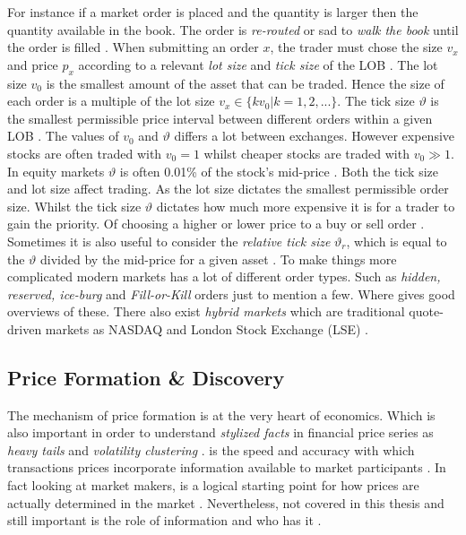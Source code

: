 \documentclass{kththesis}
\theoremstyle{definition}
\begin{document}
\newpage
For instance if a market order is placed and the quantity is larger then the quantity available in the book. The order is \textit{re-routed} or sad to \textit{walk the book} until the order is filled \parencite{hasbrouck2007empirical,cartea2015algorithmic}. When submitting an order $x$, the trader must chose the size $v_x$ and price $p_{x}$ according to a relevant \textit{lot size} and \textit{tick size} of the LOB \parencite{bouchaud2018trades}. The lot size $v_0$ is the smallest amount of the asset that can be traded. Hence the size of each order is a multiple of the lot size $v_{x} \in \{kv_{0} | k = 1,2,...\}$. The tick size $\vartheta$ is the smallest permissible price interval between different orders within a given LOB \parencite{bouchaud2018trades}. The values of $v_{0}$ and $\vartheta$ differs a lot between exchanges. However expensive stocks are often traded with $v_0 = 1$ whilst cheaper stocks are traded with $v_{0} \gg 1$. In equity markets $\vartheta$ is often 0.01\% of the stock's mid-price \parencite{bouchaud2018trades}. 
\newline
\newline
Both the tick size and lot size affect trading. As the lot size dictates the smallest permissible order size. Whilst the tick size $\vartheta$ dictates how much more expensive it is for a trader to gain the priority. Of choosing a higher or lower price to a buy or sell order \parencite{bouchaud2018trades}. Sometimes it is also useful to consider the \textit{relative tick size} $\vartheta_r$, which is equal to the $\vartheta$ divided by the mid-price for a given asset \parencite{bouchaud2018trades}. To make things more complicated modern markets has a lot of different order types. Such as \textit{hidden, reserved, ice-burg} and \textit{Fill-or-Kill} orders just to mention a few. Where \parencite{foucault2013market, cartea2015algorithmic, hasbrouck2007empirical} gives good overviews of these. There also exist \textit{hybrid markets} which are traditional quote-driven markets as NASDAQ and London Stock Exchange (LSE) \parencite{foucault2013market}.

\subsection{Price Formation \& Discovery}

The mechanism of price formation is at the very heart of economics.  Which is also important in order to understand \textit{stylized facts} in financial price series as \textit{heavy tails} and \textit{volatility clustering}  \parencite{abergel2012market}.  is the speed and accuracy with which transactions prices incorporate information available to market participants \parencite{foucault2013market}. In fact looking at market makers, is a logical starting point for how prices are actually determined in the market \parencite{madhavan2000market}. Nevertheless, not covered in this thesis and still important is the role of information and who has it \parencite{cartea2015algorithmic}.
\end{document}
